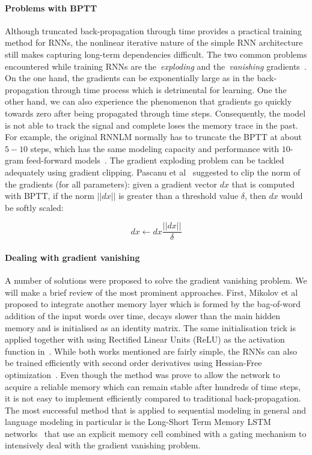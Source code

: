 \paragraph{Problems with BPTT}

Although truncated back-propagation through time provides a practical training method for RNNs, the nonlinear iterative nature of the simple RNN architecture still makes capturing long-term dependencies difficult. The two common problems encountered while training RNNs are the~\textit{exploding} and the~\textit{vanishing} gradients~\cite{bengio1994learning,pascanu2013difficulty}. On the one hand, the gradients can be exponentially large as in the back-propagation through time process which is detrimental for learning. One the other hand, we can also experience the phenomenon that gradients go quickly towards zero after being propagated through time steps. Consequently, the model is not able to track the signal and complete loses the memory trace in the past. For example, the original RNNLM normally has to truncate the BPTT at about $5-10$ steps, which has the same modeling capacity and performance with $10$-gram feed-forward models~\cite{mikolov2011extensions,hai2012measuring}. The gradient exploding problem can be tackled adequately using gradient clipping. Pascanu et al~\cite{pascanu2013difficulty} suggested to clip the norm of the gradients (for all parameters): given a gradient vector $dx$ that is computed with BPTT, if the norm $||dx||$ is greater than a threshold value $\delta$, then $dx$ would be softly scaled:

\begin{equation}
dx \leftarrow dx\frac{||dx||}{\delta}
\end{equation}

\paragraph{Dealing with gradient vanishing}

A number of solutions were proposed to solve the gradient vanishing problem. We will make a brief review of the most prominent approaches. First, Mikolov et al~\cite{mikolov2014learning} proposed to integrate another memory layer which is formed by the bag-of-word addition of the input words over time, decays slower than the main hidden memory and is initialised as an identity matrix. The same initialisation trick is applied together with using Rectified Linear Units (ReLU) as the activation function in~\cite{le2015simple}. While both works mentioned are fairly simple, the RNNs can also be trained efficiently with second order derivatives using Hessian-Free optimization~\cite{martens2011learning}. Even though the method was prove to allow the network to acquire a reliable memory which can remain stable after hundreds of time steps, it is not easy to implement efficiently compared to traditional back-propagation. The most successful method that is applied to sequential modeling in general and language modeling in particular is the Long-Short Term Memory LSTM networks~\cite{hochreiter1997long} that use an explicit memory cell combined with a gating mechanism to intensively deal with the gradient vanishing problem.


